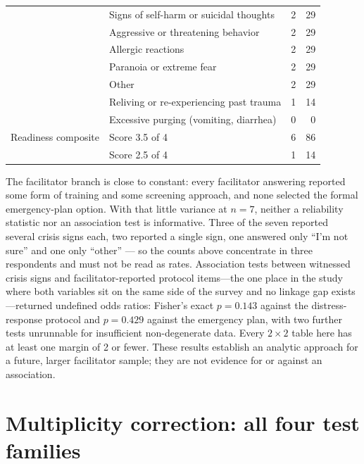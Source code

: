 \documentclass[12pt]{article}
\begin{document}
\begin{table}[htbp]
\begin{tabular}{p{4.6cm}p{5.4cm}rr}
                             & Signs of self-harm or suicidal thoughts & 2 & 29 \\
                             & Aggressive or threatening behavior & 2 & 29 \\
                             & Allergic reactions & 2 & 29 \\
                             & Paranoia or extreme fear & 2 & 29 \\
                             & Other & 2 & 29 \\
                             & Reliving or re-experiencing past trauma & 1 & 14 \\
                             & Excessive purging (vomiting, diarrhea) & 0 & 0 \\
\addlinespace
Readiness composite          & Score 3.5 of 4 & 6 & 86 \\
                             & Score 2.5 of 4 & 1 & 14 \\
\bottomrule
\end{tabular}
\end{table}

\noindent
The facilitator branch is close to constant: every facilitator answering reported some form of training and
some screening approach, and none selected the formal emergency-plan option. With that little variance at
$n=7$, neither a reliability statistic nor an association test is informative. Three of the seven reported
several crisis signs each, two reported a single sign, one answered only ``I'm not sure'' and one only
``other'' --- so the counts above concentrate in three respondents and must not be read as rates.
Association tests between witnessed crisis signs and facilitator-reported protocol items---the one place in
the study where both variables sit on the same side of the survey and no linkage gap exists---returned
undefined odds ratios: Fisher's exact $p=0.143$ against the distress-response protocol and $p=0.429$
against the emergency plan, with two further tests unrunnable for insufficient non-degenerate data. Every
$2\times2$ table here has at least one margin of 2 or fewer. These results establish an analytic approach
for a future, larger facilitator sample; they are not evidence for or against an association.

\section{Multiplicity correction: all four test families}
\end{document}
